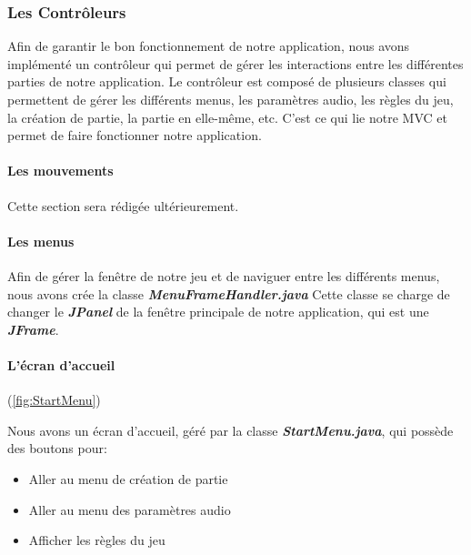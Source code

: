 \subsubsection{Les Contrôleurs}
\label{subsubsec:controleur}

Afin de garantir le bon fonctionnement de notre application, nous avons implémenté un contrôleur qui permet de gérer les interactions entre les différentes parties de notre application. Le contrôleur est composé de plusieurs classes qui permettent de gérer les différents menus, les paramètres audio, les règles du jeu, la création de partie, la partie en elle-même, etc. C'est ce qui lie notre MVC et permet de faire fonctionner notre application.

\paragraph{Les mouvements}

Cette section sera rédigée ultérieurement.

\paragraph{Les menus}

Afin de gérer la fenêtre de notre jeu et de naviguer entre les différents menus, nous avons crée la classe \textbf{\textit{MenuFrameHandler.java}} Cette classe se charge de changer le \textbf{\textit{JPanel}} de la fenêtre principale de notre application, qui est une \textbf{\textit{JFrame}}.

\paragraph{L'écran d'accueil} (\ref{fig:StartMenu})

Nous avons un écran d'accueil, géré par la classe \textbf{\textit{StartMenu.java}}, qui possède des boutons pour:

\begin{itemize}
    \item Aller au menu de création de partie
    \item Aller au menu des paramètres audio
    \item Afficher les règles du jeu
\end{itemize}

